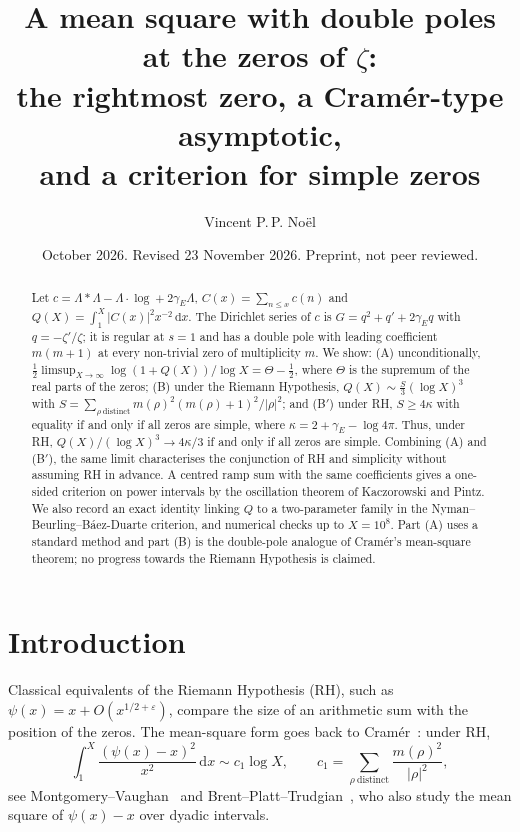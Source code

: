 \documentclass[11pt]{amsart}
\title[A double-pole mean square and simple zeros]{A mean square with double poles at the zeros of $\zeta$: \\ the rightmost zero, a Cram\'er-type asymptotic, \\ and a criterion for simple zeros}
\author{Vincent P.\,P. No\"el}
\date{October 2026. Revised 23 November 2026. Preprint, not peer reviewed.}
\theoremstyle{remark}
\theoremstyle{definition}
\newcommand{\Lam}{\Lambda}
\newcommand{\gE}{\gamma_E}
\newcommand{\dd}{\,\mathrm{d}}
\begin{document}
\begin{abstract}
Let $c=\Lam*\Lam-\Lam\cdot\log+2\gE\Lam$, $C(x)=\sum_{n\le x}c(n)$ and $Q(X)=\int_1^X|C(x)|^2x^{-2}\dd x$. The Dirichlet series of $c$ is $G=q^2+q'+2\gE q$ with $q=-\zeta'/\zeta$; it is regular at $s=1$ and has a double pole with leading coefficient $m(m+1)$ at every non-trivial zero of multiplicity $m$. We show: (A) unconditionally, $\tfrac12\limsup_{X\to\infty}\log(1+Q(X))/\log X=\Theta-\tfrac12$, where $\Theta$ is the supremum of the real parts of the zeros; (B) under the Riemann Hypothesis, $Q(X)\sim\tfrac{S}{3}(\log X)^3$ with $S=\sum_{\rho\ \mathrm{distinct}}m(\rho)^2(m(\rho)+1)^2/|\rho|^2$; and (B$'$) under RH, $S\ge 4\kappa$ with equality if and only if all zeros are simple, where $\kappa=2+\gE-\log 4\pi$. Thus, under RH, $Q(X)/(\log X)^3\to 4\kappa/3$ if and only if all zeros are simple. Combining (A) and (B$'$), the same limit characterises the conjunction of RH and simplicity without assuming RH in advance. A centred ramp sum with the same coefficients gives a one-sided criterion on power intervals by the oscillation theorem of Kaczorowski and Pintz. We also record an exact identity linking $Q$ to a two-parameter family in the Nyman--Beurling--B\'aez-Duarte criterion, and numerical checks up to $X=10^8$. Part (A) uses a standard method and part (B) is the double-pole analogue of Cram\'er's mean-square theorem; no progress towards the Riemann Hypothesis is claimed.
\end{abstract}

\maketitle

\section{Introduction}

Classical equivalents of the Riemann Hypothesis (RH), such as $\psi(x)=x+O(x^{1/2+\varepsilon})$, compare the size of an arithmetic sum with the position of the zeros. The mean-square form goes back to Cram\'er~\cite{Cra22}: under RH,
\begin{equation}\label{eq:cramer}
\int_1^X\frac{(\psi(x)-x)^2}{x^2}\dd x\sim c_1\log X,\qquad c_1=\sum_{\rho\ \mathrm{distinct}}\frac{m(\rho)^2}{|\rho|^2},
\end{equation}
see Montgomery--Vaughan~\cite[Thm.~13.6]{MV07} and Brent--Platt--Trudgian~\cite[eq.~(18)]{BPT22}, who also study the mean square of $\psi(x)-x$ over dyadic intervals.
\end{document}
